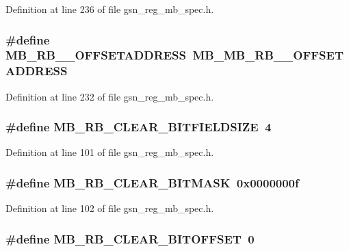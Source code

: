 Definition at line 236 of file gsn\_\-reg\_\-mb\_\-spec.h.

\hypertarget{a00562_a668bb1f277da1149fadaac1b3ec93703}{
\subsubsection[{MB\_\-RB\_\-1\_\-OFFSETADDRESS}]{\setlength{\rightskip}{0pt plus 5cm}\#define MB\_\-RB\_\_\-OFFSETADDRESS~MB\_\-MB\_\-RB\_\_\-OFFSETADDRESS}}
\label{a00562_a668bb1f277da1149fadaac1b3ec93703}


Definition at line 232 of file gsn\_\-reg\_\-mb\_\-spec.h.

\hypertarget{a00562_aa9c7244295decd35621bbcfcd69881c2}{
\subsubsection[{MB\_\-RB\_\-CLEAR\_\-BITFIELDSIZE}]{\setlength{\rightskip}{0pt plus 5cm}\#define MB\_\-RB\_\-CLEAR\_\-BITFIELDSIZE~4}}
\label{a00562_aa9c7244295decd35621bbcfcd69881c2}


Definition at line 101 of file gsn\_\-reg\_\-mb\_\-spec.h.

\hypertarget{a00562_acc555723a072b67e9f55dff986ad966b}{
\subsubsection[{MB\_\-RB\_\-CLEAR\_\-BITMASK}]{\setlength{\rightskip}{0pt plus 5cm}\#define MB\_\-RB\_\-CLEAR\_\-BITMASK~0x0000000f}}
\label{a00562_acc555723a072b67e9f55dff986ad966b}


Definition at line 102 of file gsn\_\-reg\_\-mb\_\-spec.h.

\hypertarget{a00562_a5e74d3b4b210d12c9cd2b605ec203de2}{
\subsubsection[{MB\_\-RB\_\-CLEAR\_\-BITOFFSET}]{\setlength{\rightskip}{0pt plus 5cm}\#define MB\_\-RB\_\-CLEAR\_\-BITOFFSET~0}}
\label{a00562_a5e74d3b4b210d12c9cd2b605ec203de2}



